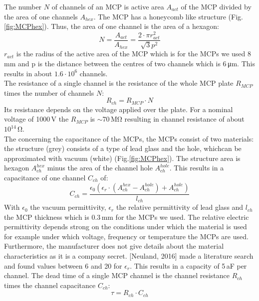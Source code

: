 		The number $N$ of channels of an MCP is active area $A_{act}$ of the MCP divided by the area of one channels $A_{hex}$. The MCP has a honeycomb like structure (Fig.\ref{fig:MCPhex}). Thus, the area of one channel is the area of a hexagon:
		\begin{equation}
			N = \frac{A_{act}}{A_{hex}} = \frac{2\cdot\pi r^2_{act}}{\sqrt{3}p^2}
		\end{equation}
		$r_{act}$ is the radius of the active area of the MCP which is for the MCPs we used 8\,\si{\milli\meter} and p is the distance between the centres of two channels which is 6\,\si{\micro\meter}. This results in about $1.6\cdot10^6$ channels.\\
		The resistance of a single channel is the resistance of the whole MCP plate $R_{MCP}$ times the number of channels $N$:
		\begin{equation}
			R_{ch} = R_{MCP}\cdot N
		\end{equation}
		Its resistance depends on the voltage applied over the plate. For a nominal voltage of 1000\,\si{\volt} the $R_{MCP}$ is $\sim$70\,\si{\mega\ohm} resulting in channel resistance of about $10^{14}$\,\si{\ohm}.\\
		The concerning the capacitance of the MCPs, the MCPs consist of two materials: the structure (grey) consists of a type of lead glass and the hole, whichcan be approximated with vacuum (white) (Fig.\ref{fig:MCPhex}). The structure area is hexagon $A^{hex}_{ch}$ minus the area of the channel hole $A^{hole}_{ch}$. This results in a capacitance of one channel $C_{ch}$ of:
		\begin{equation}
			C_{ch} = \frac{\epsilon_0  (\epsilon_r \cdot (A^{hex}_{ch} - A^{hole}_{ch})+ A^{hole}_{ch})}{l_{ch}}
		\end{equation}
		With $\epsilon_0$ the vacuum permittivity, $\epsilon_r$ the relative permittivity of lead glass and $l_{ch}$ the MCP thickness which is 0.3\,\si{\milli\meter} for the MCPs we used. The relative electric permittivity depends strong on the conditions under which the material is used for example under which voltage, frequency or temperature the MCPs are used. Furthermore, the manufacturer does not give details about the material characteristics as it is a company secret. [Neuland, 2016] made a literature search and found values between 6 and 20 for $\epsilon_r$. %
		This results in a capacity of 5\,\si{\atto\farad} per channel. The dead time of a single MCP channel is the channel resistance $R_{ch}$ times the channel capacitance $C_{ch}$:
		\begin{equation}
			\tau = R_{ch}\cdot C_{ch}
		\end{equation}
